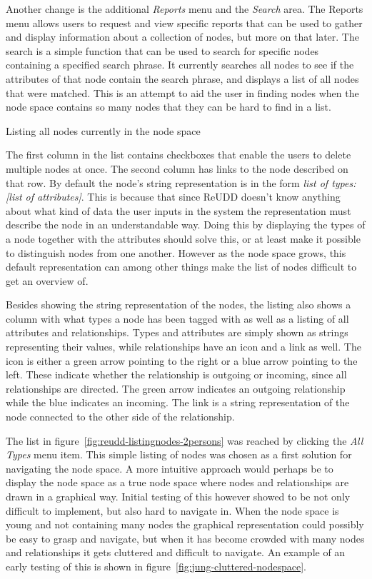 \documentclass[a4paper]{report}
\begin{document}
Another change is the additional \emph{Reports} menu and the \emph{Search} area. The Reports menu allows users to request and view specific reports that can be used to gather and display information about a collection of nodes, but more on that later. The search is a simple function that can be used to search for specific nodes containing a specified search phrase. It currently searches all nodes to see if the attributes of that node contain the search phrase, and displays a list of all nodes that were matched. This is an attempt to aid the user in finding nodes when the node space contains so many nodes that they can be hard to find in a list.

	{Listing all nodes currently in the node space}

The first column in the list contains checkboxes that enable the users to delete multiple nodes at once. The second column has links to the node described on that row. By default the node's string representation is in the form \emph{list of types:[list of attributes]}. This is because that since ReUDD doesn't know anything about what kind of data the user inputs in the system the representation must describe the node in an understandable way. Doing this by displaying the types of a node together with the attributes should solve this, or at least make it possible to distinguish nodes from one another. However as the node space grows, this default representation can among other things make the list of nodes difficult to get an overview of.

Besides showing the string representation of the nodes, the listing also shows a column with what types a node has been tagged with as well as a listing of all attributes and relationships. Types and attributes are simply shown as strings representing their values, while relationships have an icon and a link as well. The icon is either a green arrow pointing to the right or a blue arrow pointing to the left. These indicate whether the relationship is outgoing or incoming, since all relationships are directed. The green arrow indicates an outgoing relationship while the blue indicates an incoming. The link is a string representation of the node connected to the other side of the relationship.

The list in figure~\ref{fig:reudd-listingnodes-2persons} was reached by clicking the \emph{All Types} menu item. This simple listing of nodes was chosen as a first solution for navigating the node space. A more intuitive approach would perhaps be to display the node space as a true node space where nodes and relationships are drawn in a graphical way. Initial testing of this however showed to be not only difficult to implement, but also hard to navigate in. When the node space is young and not containing many nodes the graphical representation could possibly be easy to grasp and navigate, but when it has become crowded with many nodes and relationships it gets cluttered and difficult to navigate. An example of an early testing of this is shown in figure~\ref{fig:jung-cluttered-nodespace}.
\end{document}
